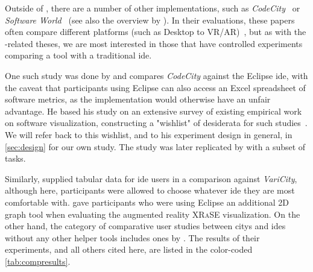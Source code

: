\documentclass[../thesis]{subfiles}
\begin{document}
Outside of \SEE{}, there are a number of other  implementations, such as \emph{CodeCity}~\cite{wettel2007} or \emph{Software World}~\cite{knight2000} (see also the overview by \textcite{jeffery2019}).
In their evaluations, these papers often compare different platforms (such as Desktop to VR/AR)~\cite[\eg,][]{merino2017,fittkau2015, merino2018}, but as with the \SEE{}-related theses, we are most interested in those that have controlled experiments comparing a  tool with a traditional \gls{ide}.

One such study was done by \textcite{wettel2011} and compares \emph{CodeCity} against the Eclipse \gls{ide}, with the caveat that participants using Eclipse can also access an Excel spreadsheet of software metrics, as the  implementation would otherwise have an unfair advantage.
He based his study on an extensive survey of existing empirical work on software visualization, constructing a "wishlist" of desiderata for such studies~\cite[chapter 7]{wettel2011}.
We will refer back to this wishlist, and to his experiment design in general, in \cref{sec:design} for our own study.
The study was later replicated by \textcite{romano2019} with a subset of tasks.

Similarly, \textcite{mortara2024} supplied tabular data for \gls{ide} users in a comparison against \emph{VariCity}, although here, participants were allowed to choose whatever \gls{ide} they are most comfortable with.
\textcite{mehra2020} gave participants who were using Eclipse an additional 2D graph tool when evaluating the augmented reality \textsc{XRaSE}  visualization.
On the other hand, the category of comparative user studies between \glspl{city} and \glspl{ide} without any other helper tools includes ones by \textcite{khaloo2017,galperin2022,lennartkipka2020}.
The results of their experiments, and all others cited here, are listed in the color-coded \cref{tab:compresults}.



\newcommand{\reside}[1]{\cellcolor{Blue}\textcolor{White}{#1}}
\newcommand{\rescc}[1]{\cellcolor{Maroon}\textcolor{White}{#1}}
\newcommand{\residel}[1]{\cellcolor{LightBlue}#1}  %
\newcommand{\resccl}[1]{\cellcolor{LightMaroon}#1}
\newcommand{\resmixed}[1]{\cellcolor{Goldenrod}#1}  %
\newcommand{\resnone}[1]{\cellcolor{Gray!70!white}No diff.}  %
\newcommand{\resna}[1]{\textcolor{Gray}{\textit{N/A}}}
\end{document}
